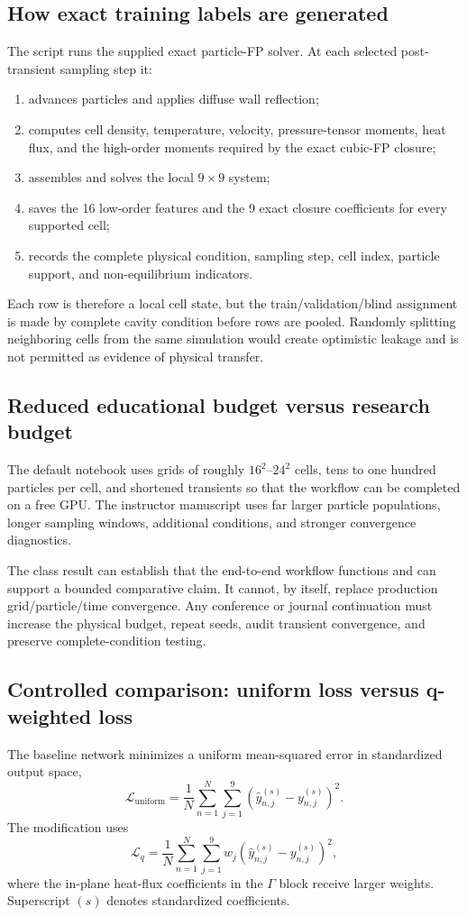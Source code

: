 \documentclass[11pt]{article}
\newcommand{\file}[1]{\path{#1}}
\begin{document}
\subsection{How exact training labels are generated}
The script \file{generate_fp_cavity_dataset.py} runs the supplied exact particle-FP solver. At each selected post-transient sampling step it:
\begin{enumerate}
\item advances particles and applies diffuse wall reflection;
\item computes cell density, temperature, velocity, pressure-tensor moments, heat flux, and the high-order moments required by the exact cubic-FP closure;
\item assembles and solves the local $9\times9$ system;
\item saves the 16 low-order features and the 9 exact closure coefficients for every supported cell;
\item records the complete physical condition, sampling step, cell index, particle support, and non-equilibrium indicators.
\end{enumerate}

Each row is therefore a local cell state, but the train/validation/blind assignment is made by complete cavity condition before rows are pooled. Randomly splitting neighboring cells from the same simulation would create optimistic leakage and is not permitted as evidence of physical transfer.

\subsection{Reduced educational budget versus research budget}
The default notebook uses grids of roughly $16^2$--$24^2$ cells, tens to one hundred particles per cell, and shortened transients so that the workflow can be completed on a free GPU. The instructor manuscript uses far larger particle populations, longer sampling windows, additional conditions, and stronger convergence diagnostics.

The class result can establish that the end-to-end workflow functions and can support a bounded comparative claim. It cannot, by itself, replace production grid/particle/time convergence. Any conference or journal continuation must increase the physical budget, repeat seeds, audit transient convergence, and preserve complete-condition testing.

\subsection{Controlled comparison: uniform loss versus q-weighted loss}
The baseline network minimizes a uniform mean-squared error in standardized output space,
\[
\mathcal L_{\mathrm{uniform}}
=\frac{1}{N}\sum_{n=1}^{N}\sum_{j=1}^{9}
\left(\widehat y^{(s)}_{n,j}-y^{(s)}_{n,j}\right)^2.
\]
The modification uses
\[
\mathcal L_q
=\frac{1}{N}\sum_{n=1}^{N}\sum_{j=1}^{9}
 w_j\left(\widehat y^{(s)}_{n,j}-y^{(s)}_{n,j}\right)^2,
\]
where the in-plane heat-flux coefficients in the $\Gamma$ block receive larger weights. Superscript $(s)$ denotes standardized coefficients.
\end{document}
